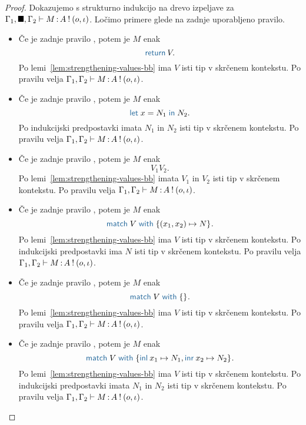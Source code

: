 \begin{proof}
	Dokazujemo s strukturno indukcijo na drevo izpeljave za $\Gamma_1, \blacksquare, \Gamma_2 \vdash M \mathinner{:} A \mathbin{!} (o, \iota)$.
	Ločimo primere glede na zadnje uporabljeno pravilo.
	
	\begin{itemize}
		\item Če je zadnje pravilo , potem je $M$ enak $$\tmreturn{V}.$$
		Po lemi~\ref{lem:strengthening-values-bb} ima $V$ isti tip v skrčenem kontekstu.
		Po pravilu  velja $\Gamma_1, \Gamma_2 \vdash M \mathinner{:} A \mathbin{!} (o, \iota)$.
		
		\item Če je zadnje pravilo , potem je $M$ enak $$\tmlet{x}{N_1}{N_2}.$$
		Po indukcijski predpostavki imata $N_1$ in $N_2$ isti tip v skrčenem kontekstu.
		Po pravilu  velja $\Gamma_1, \Gamma_2 \vdash M \mathinner{:} A \mathbin{!} (o, \iota)$.
		
		\item Če je zadnje pravilo , potem je $M$ enak $$V_1 V_2.$$
		Po lemi~\ref{lem:strengthening-values-bb} imata $V_1$ in $V_2$ isti tip v skrčenem kontekstu.
		Po pravilu  velja $\Gamma_1, \Gamma_2 \vdash M \mathinner{:} A \mathbin{!} (o, \iota)$.
		
		\item Če je zadnje pravilo , potem je $M$ enak $$\tmmatch{V}{(x_1,x_2) \mapsto N}.$$ 
		Po lemi~\ref{lem:strengthening-values-bb} ima $V$ isti tip v skrčenem kontekstu.
		Po indukcijski predpostavki ima $N$ isti tip v skrčenem kontekstu.
		Po pravilu  velja $\Gamma_1, \Gamma_2 \vdash M \mathinner{:} A \mathbin{!} (o, \iota)$.
		
		\item Če je zadnje pravilo , potem je $M$ enak $$\tmmatch{V}{}.$$
		Po lemi~\ref{lem:strengthening-values-bb} ima $V$ isti tip v skrčenem kontekstu.
		Po pravilu  velja $\Gamma_1, \Gamma_2 \vdash M \mathinner{:} A \mathbin{!} (o, \iota)$.
		
		\item Če je zadnje pravilo , potem je $M$ enak $$\tmmatch{V}{\tminl{x_1} \mapsto N_1, \tminr{x_2} \mapsto N_2}.$$
		Po lemi~\ref{lem:strengthening-values-bb} ima $V$ isti tip v skrčenem kontekstu.
		Po indukcijski predpostavki imata $N_1$ in $N_2$ isti tip v skrčenem kontekstu.
		Po pravilu  velja $\Gamma_1, \Gamma_2 \vdash M \mathinner{:} A \mathbin{!} (o, \iota)$.
		

\end{itemize}
\end{proof}
